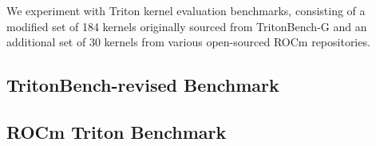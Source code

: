 

We experiment with Triton kernel evaluation benchmarks, consisting of a modified set of 184 kernels originally sourced from TritonBench-G and an additional set of 30 kernels from various open-sourced ROCm repositories.

\subsection{TritonBench-revised Benchmark}

\subsection{ROCm Triton Benchmark}


